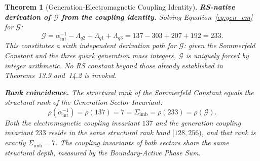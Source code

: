 \documentclass[11pt, letterpaper]{article}
\theoremstyle{definition}
\theoremstyle{plain}
\newtheorem{theorem}{Theorem}[section]
\begin{document}
\begin{theorem}[Generation-Electromagnetic Coupling Identity]
\noindent\textbf{RS-native derivation of $\mathcal{G}$ from the coupling identity.}
Solving Equation~\eqref{eq:gen_em} for $\mathcal{G}$:
\begin{equation}
    \mathcal{G} = \alpha^{-1}_\mathrm{int} - \Lambda_{q2} + \Lambda_{q1} + \Lambda_{q3}
               = 137 - 303 + 207 + 192 = 233.
    \label{eq:G_from_coupling}
\end{equation}
This constitutes a sixth independent derivation path for $\mathcal{G}$: given the
Sommerfeld Constant and the three quark generation mass integers, $\mathcal{G}$
is uniquely forced by integer arithmetic. No RS constant beyond those already
established in Theorems~13.9 and~14.2 is invoked.

\noindent\textbf{Rank coincidence.}
The structural rank of the Sommerfeld Constant equals the structural rank of
the Generation Sector Invariant:
\begin{equation}
    \rho(\alpha^{-1}_\mathrm{int}) = \rho(137) = 7 = \Sigma_\mathrm{imb} = \rho(233) = \rho(\mathcal{G}).
    \label{eq:rank_coincidence}
\end{equation}
Both the electromagnetic coupling invariant $137$ and the generation coupling invariant
$233$ reside in the same structural rank band $[128, 256)$, and that rank is exactly
$\Sigma_\mathrm{imb} = 7$. The coupling invariants of both sectors share the same
structural depth, measured by the Boundary-Active Phase Sum.
\end{theorem}
\end{document}
